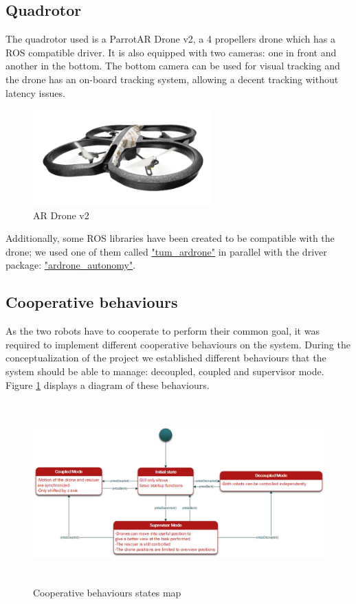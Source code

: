 \documentclass[11pt,a4paper]{article}
\begin{document}
\subsection{Quadrotor}

The quadrotor used is a Parrot\textcopyright AR Drone v2\texttrademark , a 4 propellers
drone which has a ROS compatible driver. It is also equipped with two cameras: one in front
and another in the bottom. The bottom camera can be used for visual tracking and the drone
has an on-board tracking system, allowing a decent tracking without latency issues.

\begin{figure}[ht]	
\centering
\includegraphics[height=3.7cm]{arDroneGpsEdition.png}
\caption{AR Drone v2}
\end{figure}

Additionally, some ROS libraries have been created to be compatible with the drone; we used
one of them called \href{"http://wiki.ros.org/tum_ardrone"}{"tum\_ardrone"} in parallel with
the driver package: \href{"https://github.com/AutonomyLab/ardrone_autonomy"}
{"ardrone\_autonomy"}.

\subsection{Cooperative behaviours}
As the two robots have to cooperate to perform their common goal, it was required to implement different cooperative behaviours
on the system. During the conceptualization of the project we established different
 behaviours that the system should be able to manage: decoupled, coupled and supervisor mode. Figure \ref{fig:Coop} displays a diagram of these behaviours.

\begin{figure}[ht]	
\includegraphics[height=7cm]{cooperativeModes.png}
\caption{Cooperative behaviours states map}
\label{fig:Coop}
\end{figure}
\end{document}
